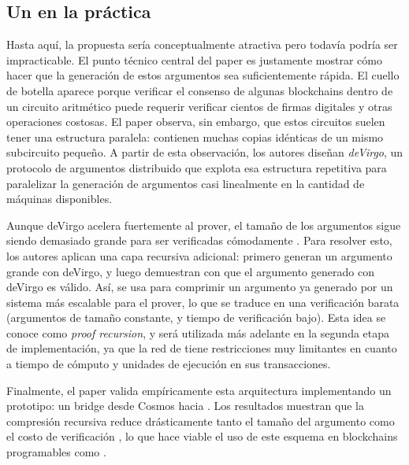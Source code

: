 \subsection{Un \zkBridge en la práctica}

Hasta aquí, la propuesta sería conceptualmente atractiva pero todavía podría ser impracticable. El punto técnico central del paper es justamente mostrar cómo hacer que la generación de estos argumentos sea suficientemente rápida. El cuello de botella aparece porque verificar el consenso de algunas blockchains dentro de un circuito aritmético puede requerir verificar cientos de firmas digitales y otras operaciones costosas. El paper observa, sin embargo, que estos circuitos suelen tener una estructura paralela: contienen muchas copias idénticas de un mismo subcircuito pequeño. A partir de esta observación, los autores diseñan \emph{deVirgo}, un protocolo de argumentos distribuido que explota esa estructura repetitiva para paralelizar la generación de argumentos casi linealmente en la cantidad de máquinas disponibles.

Aunque deVirgo acelera fuertemente al prover, el tamaño de los argumentos sigue siendo demasiado grande para ser verificadas cómodamente \Onchain. Para resolver esto, los autores aplican una capa recursiva adicional: primero generan un argumento grande con deVirgo, y luego demuestran con \Groth que el argumento generado con deVirgo es válido. Así, \Groth se usa para comprimir un argumento ya generado por un sistema más escalable para el prover, lo que se traduce en una verificación \Onchain barata (argumentos de tamaño constante, y tiempo de verificación bajo). Esta idea se conoce como \emph{proof recursion}, y será utilizada más adelante en la segunda etapa de implementación, ya que la red de \Cardano tiene restricciones muy limitantes en cuanto a tiempo de cómputo y unidades de ejecución en sus transacciones.

Finalmente, el paper valida empíricamente esta arquitectura implementando un prototipo: un bridge desde Cosmos hacia \Ethereum. Los resultados muestran que la compresión recursiva reduce drásticamente tanto el tamaño del argumento como el costo de verificación \Onchain, lo que hace viable el uso de este esquema en blockchains programables como \Ethereum.
